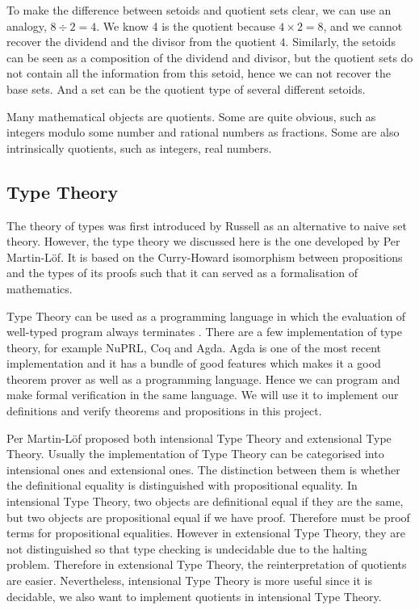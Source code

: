 \documentclass[envcountsame]{llncs}
\newcommand{\itt}{intensional Type Theory}
\newcommand{\ett}{extensional Type Theory}
\begin{document}
To make the difference between setoids and quotient sets clear, we can use an analogy, $8\div2=4$. We know 4 is the quotient because $4 \times 2 = 8$, and we cannot recover the dividend and the divisor from the quotient $4$. Similarly, the setoids can be seen as a composition of the dividend and divisor, but the quotient sets do not contain all the information from this setoid, hence we can not recover the base sets. And a set can be the quotient type of several different setoids. 


Many mathematical objects are quotients. Some are quite obvious, such as integers modulo some number and rational numbers as fractions. Some are also intrinsically quotients, such as integers, real numbers.

\subsection{Type Theory}


The theory of types was first introduced by Russell as an alternative to naive set theory. However, the type theory we discussed here is the one developed by Per Martin-L\"{o}f. It is based on the Curry-Howard isomorphism between propositions and the types of its proofs such that it can served as a formalisation of mathematics.   

Type Theory can be used as a programming language in
which the evaluation of well-typed program always terminates \cite{nor:90}. There are a few implementation of type theory, for example NuPRL, Coq and Agda. Agda is one of the most recent implementation and it has a bundle of good features which makes it a good theorem prover as well as a programming language.
Hence we can program and make formal verification in the same language. We will use it to implement our definitions and verify theorems and propositions in this project.

Per Martin-L\"{o}f proposed both intensional
Type Theory and \ett{}. Usually the implementation of Type Theory can be categorised into intensional ones and extensional ones. The distinction between them is whether the definitional equality is distinguished with
propositional equality. In \itt{}, two objects are definitional equal
if they are the same, but two objects are propositional equal if we have proof.
Therefore must be proof terms for propositional equalities. However
in \ett{}, they are not distinguished so that type checking is undecidable due to the halting problem.
Therefore in \ett{}, the reinterpretation of quotients are easier. Nevertheless, \itt{} is more useful since it is decidable, we also want to implement quotients in \itt.
\end{document}
